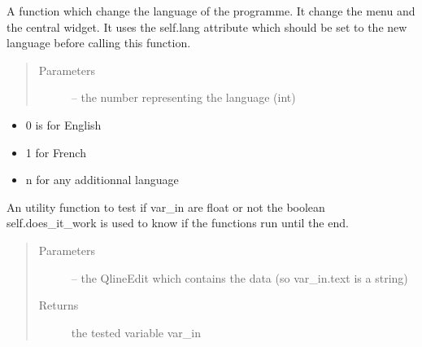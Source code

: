 \documentclass[letterpaper,10pt,english]{sphinxmanual}
\begin{document}
\begin{fulllineitems}
\begin{fulllineitems}
\end{fulllineitems}


\begin{fulllineitems}
\label{\detokenize{index:src_GUI.Main_windows_1.MainWindows.setlangue}}
A function which change the language of the programme. It change the menu and the central widget.
It uses the self.lang attribute which should be set to the new language before calling this function.
\begin{quote}\begin{description}
\item[{Parameters}] \leavevmode
{} -- the number representing the language (int)

\end{description}\end{quote}
\begin{itemize}
\item {} 
0 is for English

\item {} 
1 for French

\item {} 
n for any additionnal language

\end{itemize}

\end{fulllineitems}


\begin{fulllineitems}
\label{\detokenize{index:src_GUI.Main_windows_1.MainWindows.test_entry_float}}
An utility function to test if var\_in are float or not
the boolean self.does\_it\_work is used to know if the functions run until the end.
\begin{quote}\begin{description}
\item[{Parameters}] \leavevmode
{} -- the QlineEdit which contains the data (so var\_in.text is a string)

\item[{Returns}] \leavevmode
the tested variable var\_in

\end{description}\end{quote}

\end{fulllineitems}


\end{fulllineitems}
\end{document}
